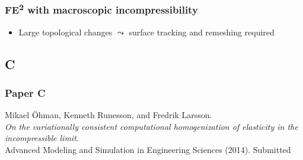 \documentclass[11pt]{beamer} %
\begin{document}
\begin{frame}
 \frametitle{FE\textsuperscript{2} with macroscopic incompressibility}
\begin{center}
\end{center}
 \begin{itemize}
  \item Large topological changes $\leadsto$ surface tracking and remeshing required
 \end{itemize}
\end{frame}




\subsection{C}
\begin{frame}
 \frametitle{Paper C}
\begin{center}
Mikael Öhman, Kenneth Runesson, and Fredrik Larsson.
\\[1em]
\textit{On the variationally consistent computational homogenization of elasticity in the incompressible limit}.
\\[1em]
Advanced Modeling and Simulation in Engineering Sciences (2014). Submitted
\end{center}
\end{frame}
\end{document}
